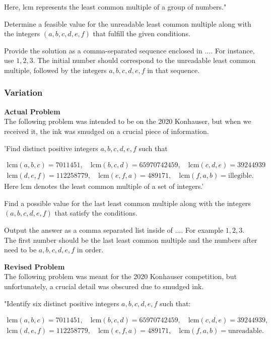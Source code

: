 Here, lcm represents the least common multiple of a group of numbers."

Determine a feasible value for the unreadable least common multiple along with the integers $(a, b, c, d, e, f)$ that fulfill the given conditions.

Provide the solution as a comma-separated sequence enclosed in $\boxed{...}$. For instance, use $\boxed{1, 2, 3}$.
The initial number should correspond to the unreadable least common multiple, followed by the integers $a, b, c, d, e, f$ in that sequence.

\subsubsection{Variation}
\textbf{Actual Problem}\\
The following problem was intended to be on the 2020 Konhauser, but when we received it, the ink was smudged on a crucial piece of information.

'Find distinct positive integers $a, b, c, d, e, f$ such that

$$
\begin{aligned}
 \text{lcm}(a, b, c) = 7011451, \quad \text{lcm}(b, c, d) = 65970742459, \quad \text{lcm}(c, d, e) = 39244939 \\
   \text{lcm}(d, e, f) = 112258779, \quad \text{lcm}(e, f, a) = 489171, \quad \text{lcm}(f, a, b) = \text{illegible}.
\end{aligned}
$$
Here lcm denotes the least common multiple of a set of integers.'

Find a possible value for the last least common multiple along with the integers $(a,b,c,d,e,f)$ that satisfy the conditions.

Output the answer as a comma separated list inside of $\boxed{...}$. For example $\boxed{1, 2, 3}$.
The first number should be the last least common multiple and the numbers after need to be $a,b,c,d,e,f$ in order.

\textbf{Revised Problem}\\
The following problem was meant for the 2020 Konhauser competition, but unfortunately, a crucial detail was obscured due to smudged ink.

"Identify six distinct positive integers $a, b, c, d, e, f$ such that:

$$
\begin{aligned}
 \text{lcm}(a, b, c) = 7011451, \quad \text{lcm}(b, c, d) = 65970742459, \quad \text{lcm}(c, d, e) = 39244939, \\
   \text{lcm}(d, e, f) = 112258779, \quad \text{lcm}(e, f, a) = 489171, \quad \text{lcm}(f, a, b) = \text{unreadable}.
\end{aligned}
$$

